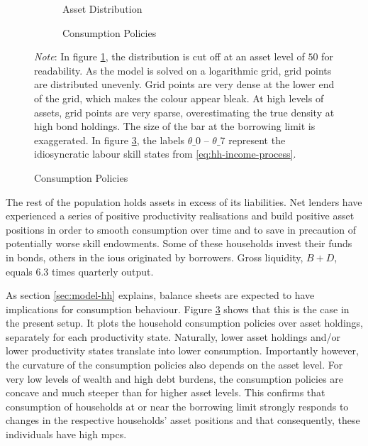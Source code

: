 \documentclass[12pt]{article} %
\numberwithin{equation}{section} %
\numberwithin{figure}{section}
\numberwithin{table}{section}
\begin{document}
\begin{figure}[t]
    \caption{The Initial Steady State}
    \label{fig:init-stst-dist-pol}
    \centering
    \begin{subfigure}[b]{0.49\textwidth}
    \caption{Asset Distribution}
    \label{fig:init-stst-dist-pol-a-dist}
         \centering
         
         \vspace{0.01cm}
     \end{subfigure}
     \hfill
     \begin{subfigure}[b]{0.49\textwidth}
     \caption{Consumption Policies}
     \label{fig:init-stst-dist-pol-c}
         \centering
         
         \vspace{0.01cm}
     \end{subfigure}
     \justifying
     \footnotesize
	\textit{Note}: In figure \ref{fig:init-stst-dist-pol-a-dist}, the distribution is cut off at an asset level of $50$ for readability. As the model is solved on a logarithmic grid, grid points are distributed unevenly. Grid points are very dense at the lower end of the grid, which makes the colour appear bleak. At high levels of assets, grid points are very sparse, overestimating the true density at high bond holdings. The size of the bar at the borrowing limit is exaggerated. In figure \ref{fig:init-stst-dist-pol-c}, the labels $\theta\_0$ -- $\theta\_7$ represent the idiosyncratic labour skill states from \eqref{eq:hh-income-process}.
\end{figure}

The rest of the population holds assets in excess of its liabilities. Net lenders have experienced a series of positive productivity realisations and build positive asset positions in order to smooth consumption over time and to save in precaution of potentially worse skill endowments. Some of these households invest their funds in bonds, others in the \Gls{iou}s originated by borrowers. Gross liquidity, $B+D$, equals $6.3$ times quarterly output.

As section \ref{sec:model-hh} explains, balance sheets are expected to have implications for consumption behaviour. Figure \ref{fig:init-stst-dist-pol-c} shows that this is the case in the present setup. It plots the household consumption policies over asset holdings, separately for each productivity state. Naturally, lower asset holdings and/or lower productivity states translate into lower consumption. Importantly however, the curvature of the consumption policies also depends on the asset level. For very low levels of wealth and high debt burdens, the consumption policies are concave and much steeper than for higher asset levels. This confirms that consumption of households at or near the borrowing limit strongly responds to changes in the respective households' asset positions and that consequently, these individuals have high \Gls{mpc}s.
\end{document}
